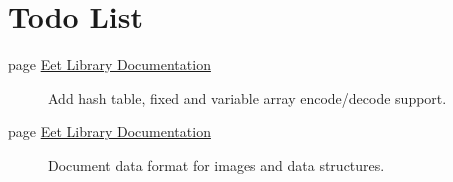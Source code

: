 \hypertarget{todo}{}\section{Todo List}\label{todo}
\label{todo__todo000001}
\hypertarget{todo__todo000001}{}
 \begin{description}
\item[page \hyperlink{index}{Eet Library Documentation} ]Add hash table, fixed and variable array encode/decode support. \end{description}


\label{todo__todo000001}
\hypertarget{todo__todo000001}{}
 \begin{description}
\item[page \hyperlink{index}{Eet Library Documentation} ]Document data format for images and data structures.

\end{description}
